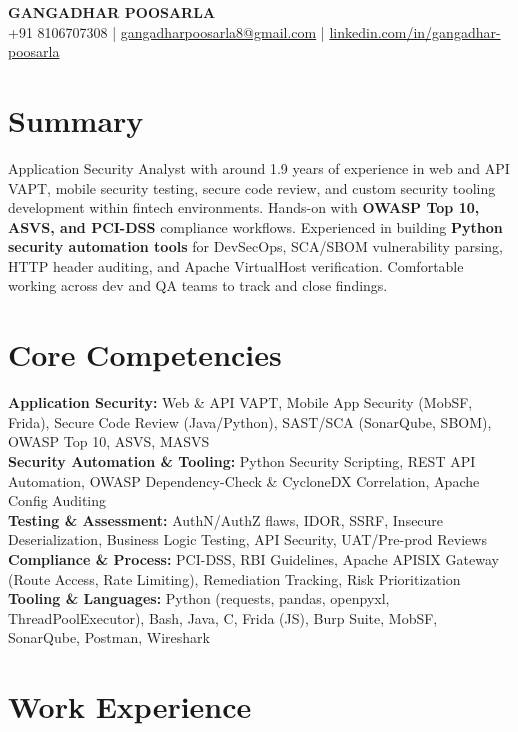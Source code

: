 \documentclass[letterpaper,10pt]{article}
\begin{document}
\begin{center}
  {\huge \textbf{GANGADHAR POOSARLA}}\\[2pt]
  +91 8106707308 \;|\; \href{mailto:gangadharpoosarla8@gmail.com}{gangadharpoosarla8@gmail.com} \;|\; \href{https://www.linkedin.com/in/gangadhar-poosarla-988524232/}{linkedin.com/in/gangadhar-poosarla}
\end{center}

\section*{Summary}
Application Security Analyst with around 1.9 years of experience in web and API VAPT, mobile security testing, secure code review, and custom security tooling development within fintech environments. Hands-on with \textbf{OWASP Top 10, ASVS, and PCI-DSS} compliance workflows. Experienced in building \textbf{Python security automation tools} for DevSecOps, SCA/SBOM vulnerability parsing, HTTP header auditing, and Apache VirtualHost verification. Comfortable working across dev and QA teams to track and close findings.

\section*{Core Competencies}
\textbf{Application Security:} Web \& API VAPT, Mobile App Security (MobSF, Frida), Secure Code Review (Java/Python), SAST/SCA (SonarQube, SBOM), OWASP Top 10, ASVS, MASVS \\
\textbf{Security Automation \& Tooling:} Python Security Scripting, REST API Automation, OWASP Dependency-Check \& CycloneDX Correlation, Apache Config Auditing \\
\textbf{Testing \& Assessment:} AuthN/AuthZ flaws, IDOR, SSRF, Insecure Deserialization, Business Logic Testing, API Security, UAT/Pre-prod Reviews \\
\textbf{Compliance \& Process:} PCI-DSS, RBI Guidelines, Apache APISIX Gateway (Route Access, Rate Limiting), Remediation Tracking, Risk Prioritization \\
\textbf{Tooling \& Languages:} Python (requests, pandas, openpyxl, ThreadPoolExecutor), Bash, Java, C, Frida (JS), Burp Suite, MobSF, SonarQube, Postman, Wireshark

\section*{Work Experience}
\end{document}

